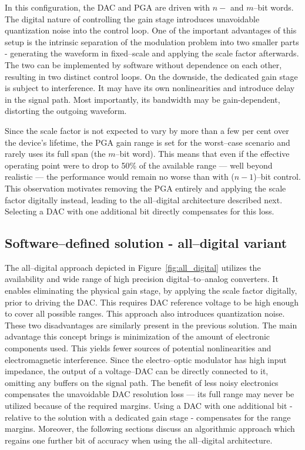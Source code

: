 \documentclass[journal,twoside,web]{ieeecolor}
\begin{document}
\noindent
In this configuration, the DAC and PGA are driven with $n-$ and $m$--bit words. The digital nature of controlling the gain stage introduces unavoidable quantization noise into the control loop. One of the important advantages of this setup is the intrinsic separation of the modulation problem into two smaller parts - generating the waveform in fixed--scale and applying the scale factor afterwards. The two can be implemented by software without dependence on each other, resulting in two distinct control loops. On the downside, the dedicated gain stage is subject to interference. It may have its own nonlinearities and introduce delay in the signal path. Most importantly, its bandwidth may be gain-dependent, distorting the outgoing waveform.

Since the scale factor is not expected to vary by more than a few per cent over the device's lifetime, the PGA gain range is set for the worst--case scenario and rarely uses its full span (the $m$--bit word). This means that even if the effective operating point were to drop to 50\% of the available range — well beyond realistic — the performance would remain no worse than with ($n-1$)--bit control. This observation motivates removing the PGA entirely and applying the scale factor digitally instead, leading to the all--digital architecture described next. Selecting a DAC with one additional bit directly compensates for this loss.

\subsection{Software--defined solution - all--digital variant}
The all--digital approach depicted in Figure~\ref{fig:all_digital} utilizes the availability and wide range of high precision digital--to--analog converters. It enables eliminating the physical gain stage, by applying the scale factor digitally, prior to driving the DAC. This requires DAC reference voltage to be high enough to cover all possible ranges. This approach also introduces quantization noise. These two disadvantages are similarly present in the previous solution. The main advantage this concept brings is minimization of the amount of electronic components used. This yields fewer sources of potential nonlinearities and electromagnetic interference. Since the electro--optic modulator has high input impedance, the output of a voltage--DAC can be directly connected to it, omitting any buffers on the signal path. The benefit of less noisy electronics compensates the unavoidable DAC resolution loss — its full range may never be utilized because of the required margins. Using a DAC with one additional bit - relative to the solution with a dedicated gain stage - compensates for the range margins. Moreover, the following sections discuss an algorithmic approach which regains one further bit of accuracy when using the all--digital architecture.
\end{document}
